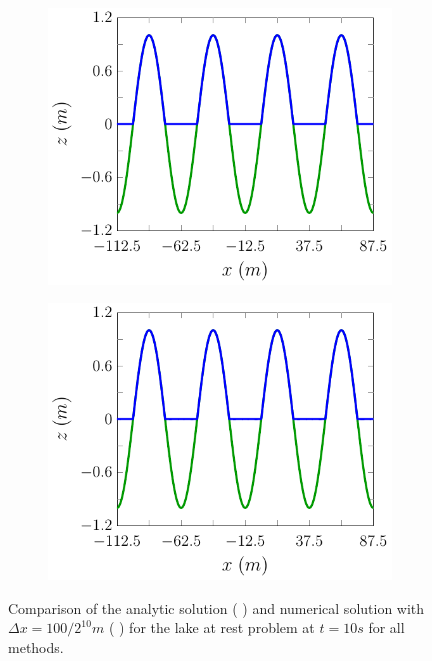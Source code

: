 \begin{figure}
\begin{subfigure}{0.5\textwidth}
	\end{subfigure}
	\begin{subfigure}{0.5\textwidth}
		\includegraphics[width=\textwidth]{./chp5/figures/Analytic/LakeAtRest/Example/FDVMWB.pdf}
		\vspace{0.5cm}
	\end{subfigure}%
	\begin{subfigure}{0.5\textwidth}
		\includegraphics[width=\textwidth]{./chp5/figures/Analytic/LakeAtRest/Example/FDVMnWB.pdf}
		\vspace{0.5cm}
	\end{subfigure}
	\caption{Comparison of the analytic solution ({\color{red} \solidrule}) and numerical solution with $\Delta x = {100} / {2^{10}}m$ ({\color{blue} \solidrule}) for the lake at rest problem at $t=10s$ for all methods.}
	\label{fig:LakeAtRestEx}
\end{figure}

